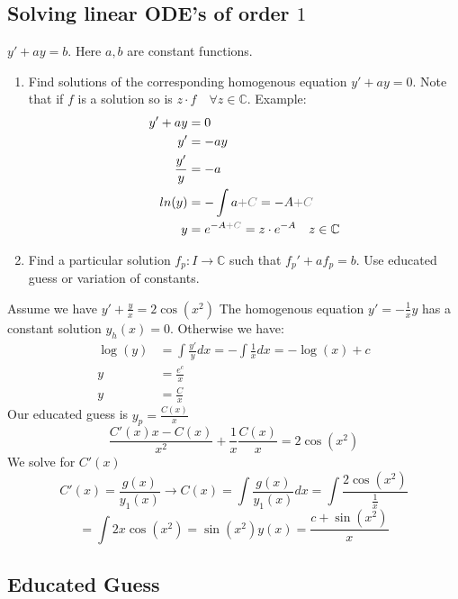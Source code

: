 \documentclass[8pt]{extarticle}
\newcommand{\C}{{\mathbb C}}
\newcommand{\ra}{{\rightarrow}}
\def\C{\mathbb{C}}
\def\BoxStart{\begin{tcolorbox}[colback=blue!5!white,colframe=blue!75!black]}
\def\BoxEnd{\end{tcolorbox}}
\def\light#1{{\color{light}#1}}
\begin{document}
\begin{multicols*}{3}
  \subsection{Solving linear ODE's of order $1$}
$y' + ay = b.$ Here $a, b$ are constant functions.

  \begin{enumerate}[label=(\arabic*)]
    \item Find solutions of the corresponding homogenous equation
          $y' + ay = 0$. Note that if $f$ is a solution so is
          $z \cdot f \quad \forall z \in \C$.
          Example:
          \begin{align*}
            y' + ay      & = 0                                                \\
            y'           & = -ay                                              \\
            \frac{y'}{y} & = -a                                               \\
            ln(y)        & = - \int a \light{+C} = -A \light{+C}              \\
            y            & = e^{-A \light{+C}} = z \cdot e^{-A}\quad z \in \C
          \end{align*}
    \item Find a particular solution $f_p: I \ra \C$
          such that $f_p' + af_p = b$. Use educated guess or variation of constants.
  \end{enumerate}
\BoxStart
Assume we have $y' + \frac{y}{x} = 2\cos(x^2)$ 
The homogenous equation $y' = -\frac{1}{x}y$ has a constant solution $y_h(x) = 0$. Otherwise we have:
\begin{align*}
	\log(y) &= \int\frac{y'}{y} dx = -\int\frac{1}{x}dx = -\log(x) + c \\
	y &= \frac{e^c}{x} \\
	y &= \frac{C}{x}
\end{align*}
Our educated guess is $y_p = \frac{C(x)}{x}$
$$\frac{C'(x)x - C(x)}{x^2} + \frac{1}{x}\frac{C(x)}{x} = 2\cos(x^2)$$
We solve for $C'(x)$
$$C'(x) = \frac{g(x)}{y_1(x)} \rightarrow C(x) = \int\frac{g(x)}{y_1(x)}dx = \int\frac{2\cos(x^2)}{\frac{1}{x}}$$
$$ = \int2x\cos(x^2) = \sin(x^2) y(x) = \frac{c + \sin(x^2)}{x}$$
\BoxEnd
  \subsection{Educated Guess}



\end{multicols*}
\end{document}
